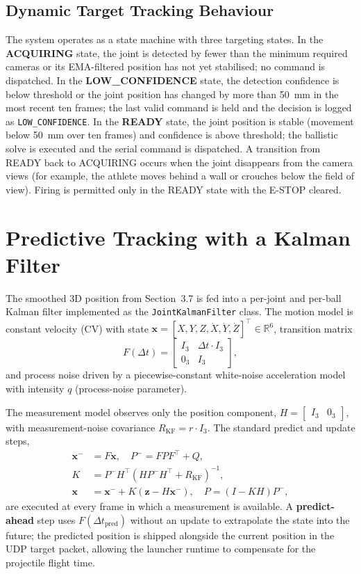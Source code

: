 \subsection{Dynamic Target Tracking Behaviour}

The system operates as a state machine with three targeting states. In the \textbf{ACQUIRING} state, the joint is detected by fewer than the minimum required cameras or its EMA-filtered position has not yet stabilised; no command is dispatched. In the \textbf{LOW\_CONFIDENCE} state, the detection confidence is below threshold or the joint position has changed by more than 50~mm in the most recent ten frames; the last valid command is held and the decision is logged as \texttt{LOW\_CONFIDENCE}. In the \textbf{READY} state, the joint position is stable (movement below 50~mm over ten frames) and confidence is above threshold; the ballistic solve is executed and the serial command is dispatched. A transition from READY back to ACQUIRING occurs when the joint disappears from the camera views (for example, the athlete moves behind a wall or crouches below the field of view). Firing is permitted only in the READY state with the E-STOP cleared.

\section{Predictive Tracking with a Kalman Filter}

The smoothed 3D position from Section~3.7 is fed into a per-joint and per-ball Kalman filter implemented as the \texttt{JointKalmanFilter} class. The motion model is constant velocity (CV) with state $\mathbf{x} = [X, Y, Z, \dot{X}, \dot{Y}, \dot{Z}]^\top \in \mathbb{R}^{6}$, transition matrix
\[
F(\Delta t) =
\begin{bmatrix}
I_3 & \Delta t \cdot I_3 \\
0_3 & I_3
\end{bmatrix},
\]
and process noise driven by a piecewise-constant white-noise acceleration model with intensity $q$ (process-noise parameter).

The measurement model observes only the position component, $H = \begin{bmatrix} I_3 & 0_3 \end{bmatrix}$, with measurement-noise covariance $R_{\text{KF}} = r \cdot I_3$. The standard predict and update steps,
\begin{align*}
\mathbf{x}^{-} &= F \mathbf{x},\quad P^{-} = F P F^\top + Q,\\
K &= P^{-} H^\top (H P^{-} H^\top + R_{\text{KF}})^{-1},\\
\mathbf{x} &= \mathbf{x}^{-} + K (\mathbf{z} - H \mathbf{x}^{-}),\quad P = (I - K H) P^{-},
\end{align*}
are executed at every frame in which a measurement is available. A \textbf{predict-ahead} step uses $F(\Delta t_{\text{pred}})$ without an update to extrapolate the state into the future; the predicted position is shipped alongside the current position in the UDP target packet, allowing the launcher runtime to compensate for the projectile flight time.

